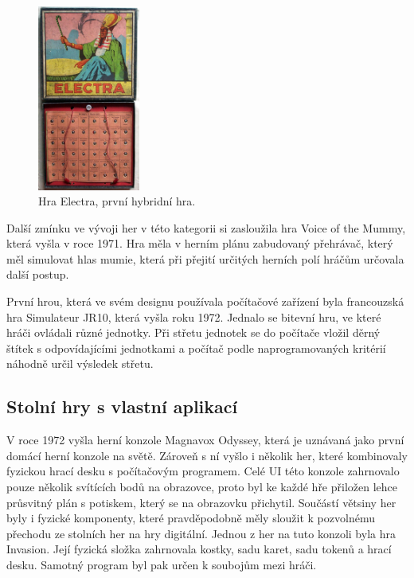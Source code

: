 \begin{figure}[H]
    \centering
    \includegraphics[width=0.3\textwidth]{resources/figures/electra.jpg}
    \caption{Hra Electra, první hybridní hra.\cite{history_of_hybrid_games}}
    \label{fig:electra}
\end{figure}

Další zmínku ve vývoji her v této kategorii si zasloužila hra Voice of the Mummy, která vyšla v roce 1971. Hra měla v herním plánu zabudovaný přehrávač, který měl simulovat hlas mumie, která při přejití určitých herních polí hráčům určovala další postup.\cite{voice_of_the_mummy}

První hrou, která ve svém designu používala počítačové zařízení byla francouzská hra Simulateur JR10, která vyšla roku 1972. Jednalo se bitevní hru, ve které hráči ovládali různé jednotky. Při střetu jednotek se do počítače vložil děrný štítek s odpovídajícími jednotkami a počítač podle naprogramovaných kritérií náhodně určil výsledek střetu.\cite{simulateur_jr10}

\subsection{Stolní hry s vlastní aplikací}
V roce 1972 vyšla herní konzole Magnavox Odyssey, která je uznávaná jako první domácí herní konzole na světě. Zároveň s ní vyšlo i několik her, které kombinovaly fyzickou hrací desku s počítačovým programem. Celé UI této konzole zahrnovalo pouze několik svítících bodů na obrazovce, proto byl ke každé hře přiložen lehce průsvitný plán s potiskem, který se na obrazovku přichytil. Součástí větsiny her byly i fyzické komponenty, které pravděpodobně měly sloužit k pozvolnému přechodu ze stolních her na hry digitální.\cite{magnavox_odyssey} Jednou z her na tuto konzoli byla hra Invasion. Její fyzická složka zahrnovala kostky, sadu karet, sadu tokenů a hrací desku. Samotný program byl pak určen k soubojům mezi hráči.\cite{invasion,invasion_gameplay}

